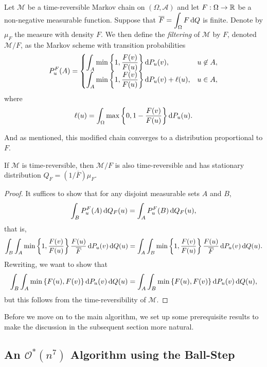 \begin{fdef}
    Let $\mathcal{M}$ be a time-reversible Markov chain on $(\Omega,\mathcal{A})$ and let $F:\Omega\to\mathbb{R}$ be a non-negative measurable function. Suppose that $\overline{F} = \displaystyle\int_\Omega F\operatorname{d}\!{Q}$ is finite. Denote by $\mu_F$ the measure with density $F$. We then define the \textit{filtering} of $\mathcal{M}$ by $F$, denoted $\mathcal{M}/F$, as the Markov scheme with transition probabilities
    \[
        P_u^F(A) = 
        \begin{cases}
            \displaystyle\int_A \min\left\{1,\frac{F(v)}{F(u)}\right\}\operatorname{d}\!{P}_u(v), & u\not\in A, \\
            \displaystyle\int_A \min\left\{1,\frac{F(v)}{F(u)}\right\}\operatorname{d}\!{P}_u(v) + \ell(u), & u\in A,
        \end{cases}
    \]
    where
    \[ \ell(u) = \int_\Omega \max\left\{0,1-\frac{F(v)}{F(u)}\right\}\operatorname{d}\!{P}_u(u). \]
\end{fdef}

And as mentioned, this modified chain converges to a distribution proportional to $F$.

\begin{theorem}
    If $\mathcal{M}$ is time-reversible, then $\mathcal{M}/F$ is also time-reversible and has stationary distribution $Q_F = (1/\overline{F})\mu_F$.
\end{theorem}
\begin{proof}
    It suffices to show that for any disjoint measurable sets $A$ and $B$,
    \[ \int_B P_u^F(A)\operatorname{d}\!{Q}_F(u) = \int_A P_u^F(B) \operatorname{d}\!{Q}_F(u), \]
    that is,
    \[ \int_B \int_A \min\left\{1,\frac{F(v)}{F(u)}\right\} \frac{F(u)}{\overline{F}} \operatorname{d}\!{P}_u(v) \operatorname{d}\!{Q}(u) = \int_A \int_B \min\left\{1,\frac{F(v)}{F(u)}\right\} \frac{F(u)}{\overline{F}} \operatorname{d}\!{P}_u(v) \operatorname{d}\!{Q}(u). \]
    Rewriting, we want to show that
    \[ \int_B \int_A \min\left\{F(u),F(v)\right\} \operatorname{d}\!{P}_u(v) \operatorname{d}\!{Q}(u) = \int_A \int_B \min\left\{F(u),F(v)\right\} \operatorname{d}\!{P}_u(v) \operatorname{d}\!{Q}(u), \]
    but this follows from the time-reversibility of $\mathcal{M}$.
\end{proof}

Before we move on to the main algorithm, we set up some prerequisite results to make the discussion in the subsequent section more natural.

\subsection{An \texorpdfstring{$\mathcal{O}^*(n^7)$}{} Algorithm using the Ball-Step}

